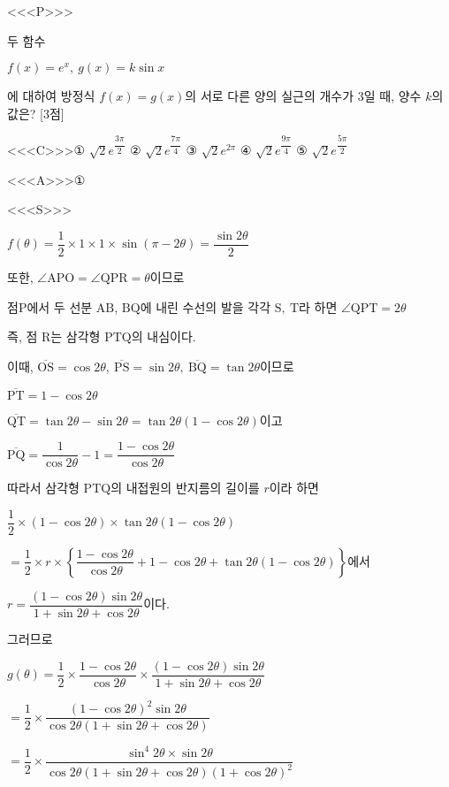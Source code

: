 \documentclass{oblivoir}
\begin{document}
<<<P>>>

두 함수

$f(x)=e^{x},\:g(x)=k\sin x$

에 대하여 방정식 $f(x)=g(x)$의 서로 다른 양의 실근의 개수가 $3$일 때, 양수 $k$의 값은? [3점]

<<<C>>>① $\sqrt{2}e^{\dfrac{3\pi}{2}}$ ② $\sqrt{2}e^{\dfrac{7\pi}{4}}$ ③ $\sqrt{2}e^{2\pi}$ ④ $\sqrt{2}e^{\dfrac{9\pi}{4}}$ ⑤ $\sqrt{2}e^{\dfrac{5\pi}{2}}$

<<<A>>>①

<<<S>>>

$f(\theta)=\dfrac{1}{2}\times 1\times 1\times\sin(\pi -2\theta)=\dfrac{\sin 2\theta}{2}$

또한, $\angle\mathrm{APO}=\angle\mathrm{QPR}=\theta$이므로

점$\mathrm{P}$에서 두 선분 $\mathrm{AB}$, $\mathrm{BQ}$에 내린 수선의 발을 각각 $\mathrm{S},\:\mathrm{T}$라 하면 $\angle\mathrm{QPT}=2\theta$

즉, 점 $\mathrm{R}$는 삼각형 $\mathrm{PTQ}$의 내심이다.

이때, $\overline{\mathrm{OS}}=\cos 2\theta ,\:\overline{\mathrm{PS}}=\sin 2\theta ,\:\overline{\mathrm{BQ}}=\tan 2\theta$이므로

$\overline{\mathrm{PT}}=1-\cos 2\theta$

$\overline{\mathrm{QT}}=\tan 2\theta -\sin 2\theta =\tan 2\theta(1 -\cos 2\theta)$이고 

$\overline{\mathrm{PQ}}=\dfrac{1}{\cos 2\theta}-1=\dfrac{1-\cos 2\theta}{\cos 2\theta}$

따라서 삼각형 $\mathrm{PTQ}$의 내접원의 반지름의 길이를 $r$이라 하면 

$\dfrac{1}{2}\times(1-\cos 2\theta)\times\tan 2\theta(1-\cos 2\theta)$

$=\dfrac{1}{2}\times r\times\left\{\dfrac{1-\cos 2\theta}{\cos 2\theta}+1-\cos 2\theta +\tan 2\theta(1-\cos 2\theta)\right\}$에서

$r =\dfrac{(1-\cos 2\theta)\sin 2\theta}{1+\sin 2\theta +\cos 2\theta}$이다. 

그러므로

$g(\theta)=\dfrac{1}{2}\times\dfrac{1-\cos 2\theta}{\cos 2\theta}\times\dfrac{(1-\cos 2\theta)\sin 2\theta}{1+\sin 2\theta +\cos 2\theta}$

$=\dfrac{1}{2}\times\dfrac{(1-\cos 2\theta)^{2}\sin 2\theta}{\cos 2\theta(1+\sin 2\theta +\cos 2\theta)}$

$=\dfrac{1}{2}\times\dfrac{\sin^{4}2\theta\times\sin 2\theta}{\cos 2\theta(1+\sin 2\theta +\cos 2\theta)(1+\cos 2\theta)^{2}}$
\end{document}
